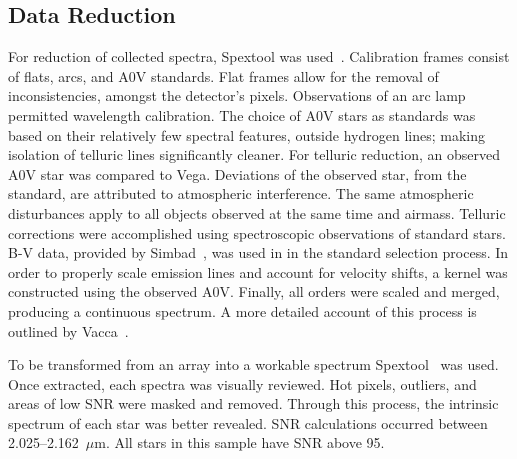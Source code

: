 \subsection{Data Reduction}

For reduction of collected spectra, Spextool was used~\cite{Cushing_2004}. 
Calibration frames consist of flats, arcs, and A0V standards.  Flat frames allow for the removal of inconsistencies, amongst the detector's pixels.  Observations of an arc lamp permitted wavelength calibration.  The choice of A0V stars as standards was based on their relatively few spectral features, outside hydrogen lines; making isolation of telluric lines significantly cleaner.  
For telluric reduction, an observed A0V star was compared to Vega.  Deviations of the observed star, from the standard, are attributed to atmospheric interference.  The same atmospheric disturbances apply to all objects observed at the same time and airmass.  Telluric corrections were accomplished using spectroscopic observations of standard stars. B-V data, provided by Simbad~\cite{simbad}, was used in in the standard selection process.
In order to properly scale emission lines and account for velocity shifts, a kernel was constructed using the observed A0V.  Finally, all orders were scaled and merged, producing a continuous spectrum.
A more detailed account of this process is outlined by Vacca~\cite{Vacca_2003}.  



To be transformed from an array into a workable spectrum Spextool~\cite{Cushing_2004} was used.  Once extracted, each spectra was visually reviewed.  Hot pixels, outliers, and areas of low SNR were masked and removed.  Through this process, the intrinsic spectrum of each star was better revealed.  SNR calculations occurred between 2.025--2.162~$\mu$m.  
All stars in this sample have SNR above 95.